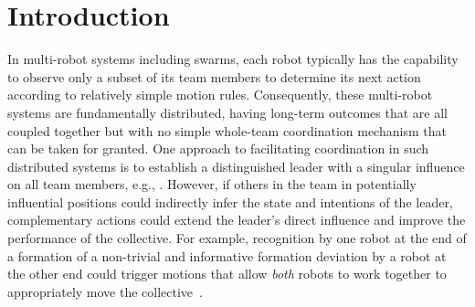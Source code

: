 \documentclass[letterpaper, 10 pt, conference]{ieeeconf}  %
\begin{document}
\begin{abstract}
	\end{abstract}



	\section{Introduction}
	\label{sec:intro}

    In multi-robot systems including swarms, each robot typically has
    the capability to observe only a subset of its team members to
    determine its next action according to relatively simple motion
    rules. Consequently, these multi-robot systems are fundamentally
    distributed, having long-term outcomes that are all coupled together
    but with no simple whole-team coordination mechanism that can be
    taken for granted. One approach to facilitating coordination in such
    distributed systems is to establish a distinguished leader with a
    singular influence on all team members, e.g., \cite{EB16, DGRSS17,
    Stern18}. However, if others in the team in potentially influential
    positions could indirectly infer the state and intentions of the
    leader, complementary actions could extend the leader's direct
    influence and improve the performance of the collective. For
    example, recognition by one robot at the end of a formation of a
    non-trivial and informative formation deviation by a robot at the
    other end could trigger motions that allow \emph{both} robots to
    work together to appropriately move the collective~\cite{CPR17}.
\end{document}
